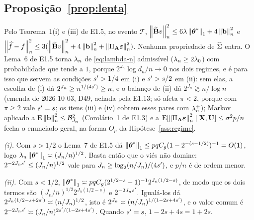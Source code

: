 \documentclass[11pt,a4paper]{article}
\newcommand{\Amat}{\mathbf{A}}
\newcommand{\Bmat}{\mathbf{B}}
\newcommand{\Btil}{\widetilde{\Bmat}}
\newcommand{\PA}{\Pi_{\Amat}}
\newcommand{\bveps}{\boldsymbol{\varepsilon}}
\newcommand{\bb}{\mathbf{b}}
\begin{document}
\subsection*{Proposição~\ref{prop:lenta}}

Pelo Teorema~1(i) e (iii) de E1.5, no evento $\mathcal{T}$,
$\normn{\Btil v}^{2} \le 6\pen\norm{\thetastar}_{1} + 4\normn{\bb}^{2}$ e
$\normn{\widehat f - f}^{2} \le 3(\normn{\Btil v}^{2} + 4\normn{\bb}^{2}
+ \normn{\PA\bveps}^{2})$. Nenhuma propriedade de $\widehat{\Sigma}$ entra. O
Lema~6 de E1.5 torna $\lambda_{n}$ de \eqref{eq:lambda-n} admissível
($\lambda_{n} \ge 2\lambda_{0}$) com probabilidade que tende a $1$, porque
$2^{J_{n}}\log d_{n}/n \to 0$ nos dois regimes, e é para isso que servem as
condições $s' > 1/4$ em (i) e $s' > s/2$ em (ii): sem elas, a escolha de
(i) dá $2^{J_{n}} \ge n^{1/(4s')} \ge n$, e o balanço de (ii) dá
$2^{J_{n}} \gtrsim n/\log n$ (emenda de 2026-10-03, D49, achada pela E1.13;
só afeta $\pi < 2$, porque com $\pi \ge 2$ vale $s' = s$; os itens (iii) e
(iv) cobrem esses pares com $\lambda_{n}^{+}$); Markov aplicado
a $\E\normn{\bb}^{2} \le \mathcal{B}_{J_{n}}^{2}$ (Corolário~1 de E1.3) e a
$\E[\normn{\PA\bveps}^{2}\mid\bX,\bU] \le \sigma^{2}p/n$ fecha o enunciado
geral, na forma $O_{p}$ da Hipótese~\ref{ass:regime}.

\emph{(i).} Com $s > 1/2$ o Lema~7 de E1.5 dá
$\left\lVert \boldsymbol{\theta}^{*} \right\rVert_{1} \le pqC_{g}(1-2^{-(s-1/2)})^{-1} = O(1)$, logo
$\lambda_{n}\left\lVert \boldsymbol{\theta}^{*} \right\rVert_{1} \asymp (J_{n}/n)^{1/2}$. Basta então que o viés
não domine: $2^{-2J_{n}s'} \le (J_{n}/n)^{1/2}$ vale para
$J_{n} \ge \log_{2}(n/J_{n})/(4s')$, e $p/n$ é de ordem menor.

\emph{(ii).} Com $s < 1/2$, $\left\lVert \boldsymbol{\theta}^{*} \right\rVert_{1} \asymp
pqC_{g}(2^{1/2-s}-1)^{-1}2^{J_{n}(1/2-s)}$, de modo que os dois termos são
$(J_{n}/n)^{1/2}2^{J_{n}(1/2-s)}$ e $2^{-2J_{n}s'}$. Igualá-los dá
$2^{J_{n}(1/2-s+2s')} \asymp (n/J_{n})^{1/2}$, isto é
$2^{J_{n}} \asymp (n/J_{n})^{1/(1-2s+4s')}$, e o valor comum é
$2^{-2J_{n}s'} \asymp (J_{n}/n)^{2s'/(1-2s+4s')}$. Quando
$s' = s$, $1-2s+4s = 1+2s$.
\end{document}
